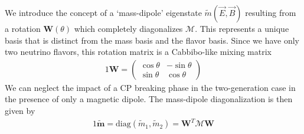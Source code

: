 \documentclass[a4paper]{article}
\newcommand*{\bb}{\boldsymbol}
\begin{document}
We introduce the concept of a `mass-dipole' eigenstate $\tilde{m}(\vec{E},\vec{B})$ resulting from a rotation $\bb{W}(\theta)$ which completely diagonalizes $\bb{\mathcal{M}}$. This represents a unique basis that is distinct from the mass basis and the flavor basis. Since we have only two neutrino flavors, this rotation matrix is a Cabbibo-like mixing matrix
\begin{alignat}{1}
	\label{mix:eq:04} \bb{W} = 
	\begin{pmatrix}
		\cos{\theta} & -\sin{\theta}\\
		\sin{\theta} & \cos{\theta}
	\end{pmatrix}
\end{alignat}
We can neglect the impact of a CP breaking phase in the two-generation case in the presence of only a magnetic dipole. The mass-dipole diagonalization is then given by
\begin{alignat}{1}
	\label{mix:eq:05} \bb{\tilde{m}} = \mathrm{diag}(\tilde{m}_{1},\tilde{m}_{2})=\bb{W}^{T}\bb{\mathcal{M}}\bb{W}
\end{alignat}



\end{document}
